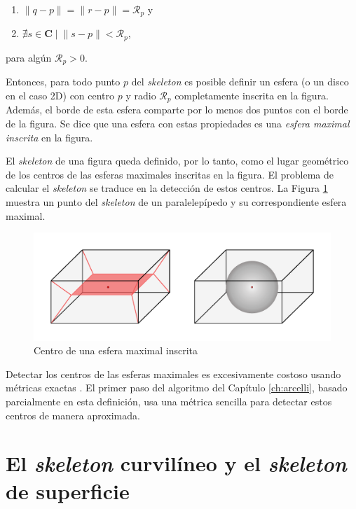 \begin{enumerate}
\item $\lVert q - p \rVert = \lVert r - p \rVert = \mathcal{R}_p$ y
\item $\nexists s \in \boldsymbol{C} \mid \lVert s - p \rVert < \mathcal{R}_p$,
\end{enumerate}

\noindent
para algún $\mathcal{R}_p > 0$.

Entonces, para todo punto $p$ del \textit{skeleton} es posible definir un esfera (o un disco en el caso 2D) con centro $p$ y radio $\mathcal{R}_p$ completamente inscrita en la figura. Además, el borde de esta esfera comparte por lo menos dos puntos con el borde de la figura. Se dice que una esfera con estas propiedades es una \textit{esfera maximal inscrita} en la figura.

El \textit{skeleton} de una figura queda definido, por lo tanto, como el lugar geométrico de los centros de las esferas maximales inscritas en la figura. El problema de calcular el \textit{skeleton} se traduce en la detección de estos centros. La Figura \ref{fig:rect_cbm} muestra un punto del \textit{skeleton} de un paralelepípedo y su correspondiente esfera maximal.

\begin{figure}[ht]\centering
\includegraphics[width=0.9\linewidth]{images/rect_cbm}
\caption{Centro de una esfera maximal inscrita}
\label{fig:rect_cbm}
\end{figure}

Detectar los centros de las esferas maximales es excesivamente costoso usando métricas exactas \cite{borgefors1996digital}. El primer paso del algoritmo del Capítulo \ref{ch:arcelli}, basado parcialmente en esta definición, usa una métrica sencilla para detectar estos centros de manera aproximada.

\section{El \textit{skeleton} curvilíneo y el \textit{skeleton} de superficie}

